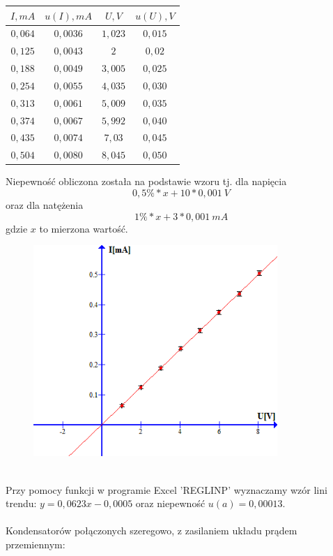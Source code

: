 \documentclass{article}
\begin{document}
\begin{center}
    \begin{tabular}{|c|c|c|c|}
    \hline
$I,mA$ & $u(I), mA$ & $U,V$ & $u(U), V$\\ \hline
$0,064$ & $0,0036$ & $1,023$ & $0,015$\\ \hline
$0,125$ & $0,0043$ & $2$ & $0,02$\\ \hline
$0,188$ & $0,0049$ & $3,005$ & $0,025$\\ \hline
$0,254$ & $0,0055$ & $4,035$ & $0,030$\\ \hline
$0,313$ & $0,0061$ & $5,009$ & $0,035$\\ \hline
$0,374$ & $0,0067$ & $5,992$ & $0,040$\\ \hline
$0,435$ & $0,0074$ & $7,03$ & $0,045$\\ \hline
$0,504$ & $0,0080$ & $8,045$ & $0,050$\\ \hline
    \end{tabular}
\end{center}
Niepewność obliczona została na podstawie wzoru tj. dla napięcia
$$0,5\% * x + 10 * 0,001\ V $$
oraz dla natężenia
$$1\% * x + 3 * 0,001\ mA$$
gdzie $x$ to mierzona wartość.
\begin{figure}[ht]
\centering
\includegraphics[height=8cm]{wykres_5.png}
\end{figure}\\
Przy pomocy funkcji w programie Excel 'REGLINP' wyznaczamy wzór lini trendu: $y = 0,0623x - 0,0005$ oraz niepewność $u(a) = 0,00013$.\\\\
Kondensatorów połączonych szeregowo, z zasilaniem układu prądem przemiennym:
\end{document}
